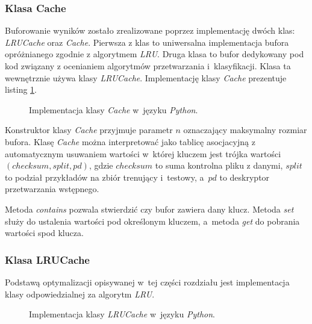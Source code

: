 \documentclass[../thesis.tex]{subfiles}
\begin{document}
\subsubsection{Klasa Cache}

Buforowanie wyników zostało zrealizowane poprzez implementację dwóch klas: \emph{LRUCache} oraz \emph{Cache}. Pierwsza z klas to uniwersalna implementacja bufora opróżnianego zgodnie z algorytmem \emph{LRU}. Druga klasa to bufor dedykowany pod kod związany z ocenianiem algorytmów przetwarzania i~klasyfikacji. Klasa ta wewnętrznie używa klasy \emph{LRUCache}. Implementację klasy \emph{Cache} prezentuje listing \ref{impl:snippet_cache}.

\begin{figure}[h]
\centering
{}

\caption{Implementacja klasy \emph{Cache} w~języku \emph{Python}.}
\label{impl:snippet_cache}
\end{figure}

Konstruktor klasy \emph{Cache} przyjmuje parametr $n$ oznaczający maksymalny rozmiar bufora. Klasę \emph{Cache} można interpretować jako tablicę asocjacyjną z automatycznym usuwaniem wartości w~której kluczem jest trójka wartości $(checksum, split, pd)$, gdzie $checksum$ to suma kontrolna pliku z danymi, $split$ to podział przykładów na zbiór trenujący i~testowy, a~$pd$ to deskryptor przetwarzania wstępnego.

Metoda \emph{contains} pozwala stwierdzić czy bufor zawiera dany klucz. Metoda \emph{set} służy do ustalenia wartości pod określonym kluczem, a~metoda \emph{get} do pobrania wartości spod klucza.

\subsubsection{Klasa LRUCache}

Podstawą optymalizacji opisywanej w~tej części rozdziału jest implementacja klasy odpowiedzialnej za algorytm \emph{LRU}.

\begin{figure}[h]
\centering
{}

\caption{Implementacja klasy \emph{LRUCache} w~języku \emph{Python}.}
\label{impl:snippet_lru}
\end{figure}
\end{document}
